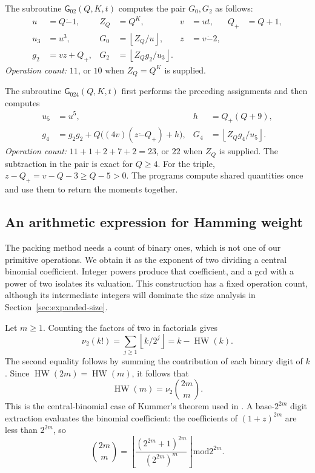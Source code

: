 \documentclass[11pt]{article}
\theoremstyle{remark}
\newcommand{\tsub}{\mathbin{\dot{-}}}
\newcommand{\md}{\mathbin{\mathrm{mod}}}
\newcommand{\fl}[1]{\left\lfloor #1\right\rfloor}
\newcommand{\HW}{\operatorname{HW}}
\newcommand{\Gpair}{\mathsf{G}_{02}}
\newcommand{\Gtriple}{\mathsf{G}_{024}}
\begin{document}
The subroutine $\Gpair(Q,K,t)$ computes the pair $G_0,G_2$ as follows:
\begin{align*}
  u&=Q\tsub1,& Z_Q&=Q^K,& v&=ut,& Q_+&=Q+1,\\
  u_3&=u^3,& G_0&=\fl{Z_Q/u},& z&=v\tsub2,\\
  g_2&=vz+Q_+,& G_2&=\fl{Z_Qg_2/u_3}.&&
\end{align*}
\emph{Operation count:} $11$, or $10$ when $Z_Q=Q^K$ is supplied.

The subroutine $\Gtriple(Q,K,t)$ first performs the preceding
assignments and then computes
\begin{align*}
  u_5&=u^5,& h&=Q_+(Q+9),\\
  g_4&=g_2g_2+Q\bigl((4v)(z\tsub Q_+)+h\bigr),&
  G_4&=\fl{Z_Qg_4/u_5}.
\end{align*}
\emph{Operation count:} $11+1+2+7+2=23$, or $22$ when $Z_Q$ is
supplied. The subtraction in the pair is exact for $Q\ge4$.
For the triple, $z-Q_+=v-Q-3\ge Q-5>0$.
The programs compute shared quantities once and use them to return
the moments together.

\subsection{An arithmetic expression for Hamming weight}\label{sec:hw}

The packing method needs a count of binary ones, which is not one of our
primitive operations. We obtain it as the exponent of two dividing a
central binomial coefficient. Integer powers produce that coefficient,
and a gcd with a power of two isolates its valuation. This construction
has a fixed operation count, although its intermediate integers will
dominate the size analysis in Section~\ref{sec:expanded-size}.

Let $m\ge1$. Counting the factors of two in factorials gives
\[
  \nu_2(k!)=\sum_{j\ge1}\fl{k/2^j}=k-\HW(k).
\]
The second equality follows by summing the contribution of each binary
digit of $k$. Since $\HW(2m)=\HW(m)$, it follows that
\begin{equation}\label{eq:kummer}
  \HW(m)=\nu_2\binom{2m}{m}.
\end{equation}
This is the central-binomial case of Kummer's theorem used in
\cite{PSh24}. A base-$2^{2m}$ digit extraction evaluates the binomial
coefficient: the coefficients of $(1+z)^{2m}$ are less than $2^{2m}$,
so
\begin{equation}\label{eq:binomial}
  \binom{2m}{m}
  =\fl{\frac{(2^{2m}+1)^{2m}}{(2^{2m})^m}}\md 2^{2m}.
\end{equation}
\end{document}
